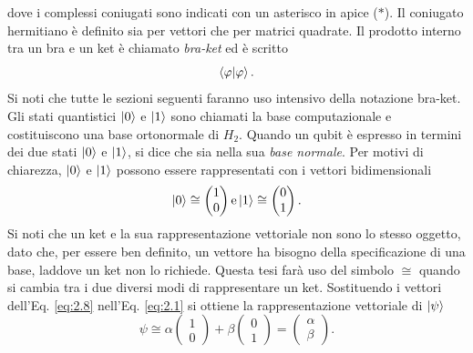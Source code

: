 dove i complessi coniugati sono indicati con un asterisco in apice ($*$).
Il coniugato hermitiano è definito sia per vettori che per matrici quadrate. 
Il prodotto interno tra un bra e un ket è chiamato \emph{bra-ket} ed è scritto 
\begin{equation}
    \braket{\varphi|\varphi}.
\end{equation}
Si noti che tutte le sezioni seguenti faranno uso intensivo della notazione bra-ket. 
Gli stati quantistici $\ket{0}$ e $\ket{1}$ sono chiamati la base computazionale e 
costituiscono una base ortonormale di $H_2$. Quando un qubit è espresso in termini 
dei due stati $\ket{0}$ e $\ket{1}$, si dice che sia nella sua \emph{base normale}. 
Per motivi di chiarezza, $\ket{0}$ e $\ket{1}$ possono essere rappresentati con i vettori 
bidimensionali 
\begin{equation} \label{eq:2.8}
    \ket{0} \cong \begin{pmatrix}
        1\\0
    \end{pmatrix}
    \text{e} \ket{1} \cong \begin{pmatrix}
        0\\1
    \end{pmatrix}.
\end{equation}
Si noti che un ket e la sua rappresentazione vettoriale non sono lo stesso oggetto, 
dato che, per essere ben definito, un vettore ha bisogno della specificazione di una base, 
laddove un ket non lo richiede. Questa tesi farà uso del simbolo $\cong$ quando si cambia tra 
i due diversi modi di rappresentare un ket. Sostituendo i vettori dell'Eq. \ref{eq:2.8} 
nell'Eq. \ref{eq:2.1} si ottiene la rappresentazione vettoriale di $\ket{\psi}$
\begin{equation} \label{eq:2.9}
    \psi \cong \alpha \begin{pmatrix}
        1\\0
    \end{pmatrix} + \beta \begin{pmatrix}
        0\\1
    \end{pmatrix} = \begin{pmatrix}
        \alpha \\ \beta
    \end{pmatrix}.
\end{equation}

